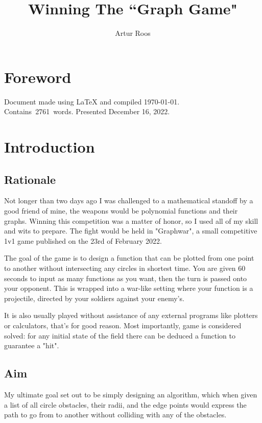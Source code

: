 \documentclass[12pt, titlepage]{article}
\title{Winning The ``Graph Game"}
\author{Artur Roos}
\begin{document}
\maketitle
\tableofcontents

\setcounter{secnumdepth}{-1}
\section{Foreword}
Document made using \LaTeX \hphantom{ } and compiled \today.\\ \mbox{Contains 2761 words.}
Presented December 16, 2022.

\section{Introduction}
\subsection{Rationale}
Not longer than two days ago I was challenged to a mathematical standoff by a 
good friend of mine, the weapons would be polynomial functions and their 
graphs. Winning this competition was a matter of honor, so I used all of my 
skill and wits to prepare. The fight would be held in \mbox{"Graphwar"}, a 
small competitive 1v1 game published on the 23rd of February 2022\cite{graphwar}. 

The goal of the game is to design a function that can be plotted from one point
to another without intersecting any circles in shortest time. You are given 
60 seconds to input as many functions as you want, then the turn is passed onto
your opponent.
This is wrapped into a war-like setting where your function is a projectile, 
directed by your soldiers against your enemy's.

It is also usually played without assistance of any external programs like 
plotters or calculators, that's for good reason. Most importantly, game is
considered solved: for any initial state of the field there can be deduced a 
function to guarantee a "hit". 

\subsection{Aim}
My ultimate goal set out to be simply designing an algorithm, which when given
a list of all circle obstacles, their radii, and the edge points would express
the path to go from to another without colliding with any of the obstacles. 
\end{document}
